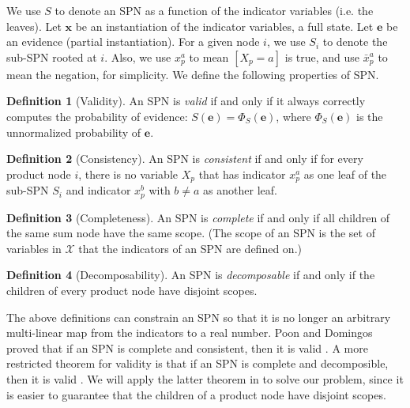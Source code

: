 \documentclass[10pt, titlepage]{article}
\theoremstyle{definition}
\newtheorem{definition}{Definition}[section]
\newcommand\mb{\mathbf}
\begin{document}
We use $S$ to denote an SPN as a function of the indicator variables (i.e. the leaves). Let $\mb{x}$ be an instantiation of the indicator variables, a full state. Let $\mb{e}$ be an evidence (partial instantiation). For a given node $i$, we use $S_i$ to denote the sub-SPN rooted at $i$. Also, we use $x_{p}^a$ to mean $[X_p=a]$ is true, and use $\bar{x}_p^a$ to mean the negation, for simplicity. We define the following properties of SPN.

\begin{definition}[Validity]
An SPN is \textit{valid} if and only if it always correctly computes the probability of evidence: $S(\mb{e})=\Phi_S(\mb{e})$, where $\Phi_S(\mb{e})$ is the unnormalized probability of $\mb{e}$.
\end{definition}

\begin{definition}[Consistency]
An SPN is \textit{consistent} if and only if for every product node $i$, there is no variable $X_p$ that has indicator $x_p^a$ as one leaf of the sub-SPN $S_i$ and indicator $x_p^b$ with $b\neq a$ as another leaf.
\end{definition}

\begin{definition}[Completeness]
An SPN is \textit{complete} if and only if all children of the same sum node have the same scope. (The scope of an SPN is the set of variables in $\mathcal{X}$ that the indicators of an SPN are defined on.)
\end{definition}

\begin{definition}[Decomposability]
An SPN is \textit{decomposable} if and only if the children of every product node have disjoint scopes.
\end{definition}

The above definitions can constrain an SPN so that it is no longer an arbitrary multi-linear map from the indicators to a real number. Poon and Domingos proved that if an SPN is complete and consistent, then it is valid \cite{poon2011sum}. A more restricted theorem for validity is that if an SPN is complete and decomposible, then it is valid \cite{peharz2015theoretical}. We will apply the latter theorem in to solve our problem, since it is easier to guarantee that the children of a product node have disjoint scopes.
\end{document}
